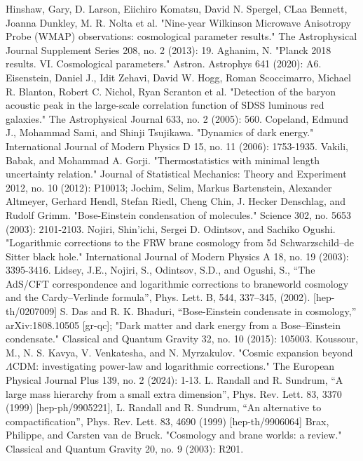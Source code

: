\documentclass[12pt]{article}  %
\begin{document}
\begin{thebibliography}{99}
 Hinshaw, Gary, D. Larson, Eiichiro Komatsu, David N. Spergel, CLaa Bennett, Joanna Dunkley, M. R. Nolta et al. "Nine-year Wilkinson Microwave Anisotropy Probe (WMAP) observations: cosmological parameter results." The Astrophysical Journal Supplement Series 208, no. 2 (2013): 19.
 Aghanim, N. "Planck 2018 results. VI. Cosmological parameters." Astron. Astrophys 641 (2020): A6.
 Eisenstein, Daniel J., Idit Zehavi, David W. Hogg, Roman Scoccimarro, Michael R. Blanton, Robert C. Nichol, Ryan Scranton et al. "Detection of the baryon acoustic peak in the large-scale correlation function of SDSS luminous red galaxies." The Astrophysical Journal 633, no. 2 (2005): 560.
 Copeland, Edmund J., Mohammad Sami, and Shinji Tsujikawa. "Dynamics of dark energy." International Journal of Modern Physics D 15, no. 11 (2006): 1753-1935.
 Vakili, Babak, and Mohammad A. Gorji. "Thermostatistics with minimal length uncertainty relation." Journal of Statistical Mechanics: Theory and Experiment 2012, no. 10 (2012): P10013; Jochim, Selim, Markus Bartenstein, Alexander Altmeyer, Gerhard Hendl, Stefan Riedl, Cheng Chin, J. Hecker Denschlag, and Rudolf Grimm. "Bose-Einstein condensation of molecules." Science 302, no. 5653 (2003): 2101-2103.
Nojiri, Shin'ichi, Sergei D. Odintsov, and Sachiko Ogushi. "Logarithmic corrections to the FRW brane cosmology from 5d Schwarzschild–de Sitter black hole." International Journal of Modern Physics A 18, no. 19 (2003): 3395-3416.
Lidsey, J.E., Nojiri, S., Odintsov, S.D., and Ogushi, S., “The AdS/CFT correspondence and logarithmic corrections to braneworld cosmology and the Cardy–Verlinde formula”, Phys. Lett. B, 544, 337–345, (2002). [hep-th/0207009]
S. Das and R. K. Bhaduri, “Bose-Einstein condensate in cosmology,” arXiv:1808.10505 [gr-qc]; "Dark matter and dark energy from a Bose–Einstein condensate." Classical and Quantum Gravity 32, no. 10 (2015): 105003.
 Koussour, M., N. S. Kavya, V. Venkatesha, and N. Myrzakulov. "Cosmic expansion beyond $\Lambda$CDM: investigating power-law and logarithmic corrections." The European Physical Journal Plus 139, no. 2 (2024): 1-13. 
L. Randall and R. Sundrum, “A large mass hierarchy from a small extra dimension”, Phys. Rev. Lett. 83, 3370 (1999) [hep-ph/9905221], L. Randall and R. Sundrum, “An alternative to compactification”, Phys. Rev. Lett. 83, 4690 (1999) [hep-th/9906064]
Brax, Philippe, and Carsten van de Bruck. "Cosmology and brane worlds: a review." Classical and Quantum Gravity 20, no. 9 (2003): R201.

\end{thebibliography}
\end{document}
